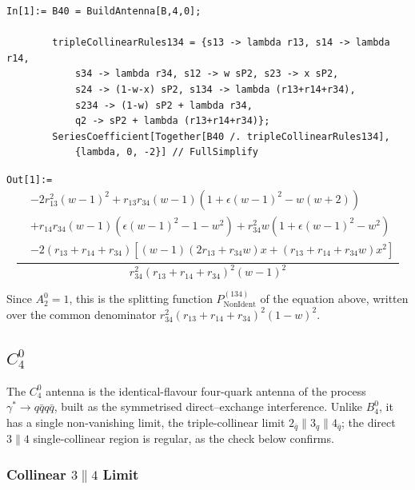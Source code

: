 \begin{mdframed}[backgroundcolor=gray!10, linewidth=0pt]
\begin{lstlisting}
In[1]:= B40 = BuildAntenna[B,4,0];

        tripleCollinearRules134 = {s13 -> lambda r13, s14 -> lambda r14,
            s34 -> lambda r34, s12 -> w sP2, s23 -> x sP2,
            s24 -> (1-w-x) sP2, s134 -> lambda (r13+r14+r34),
            s234 -> (1-w) sP2 + lambda r34,
            q2 -> sP2 + lambda (r13+r14+r34)};
        SeriesCoefficient[Together[B40 /. tripleCollinearRules134],
            {lambda, 0, -2}] // FullSimplify
\end{lstlisting}
\texttt{Out[1]:=}
    \begin{equation*}
        \frac{\begin{aligned}
            &-2r_{13}^2(w-1)^2+r_{13}r_{34}(w-1)\left(1+\epsilon(w-1)^2-w(w+2)\right)\\
            &+r_{14}r_{34}(w-1)\left(\epsilon(w-1)^2-1-w^2\right)+r_{34}^2w\left(1+\epsilon(w-1)^2-w^2\right)\\
            &-2(r_{13}+r_{14}+r_{34})\left[(w-1)(2r_{13}+r_{34}w)x+(r_{13}+r_{14}+r_{34}w)x^2\right]
        \end{aligned}}{r_{34}^2(r_{13}+r_{14}+r_{34})^2(w-1)^2}
    \end{equation*}
\end{mdframed}
Since $A_2^0=1$, this is the splitting function $P_\mathrm{NonIdent}^{(134)}$ of the equation above, written over the common denominator
$r_{34}^2(r_{13}+r_{14}+r_{34})^2(1-w)^2$.


\subsection{$C_4^0$}\label{subsec:localValidationC40}

The $C_4^0$ antenna is the identical-flavour four-quark antenna of the process $\gamma^*\to q\bar qq\bar q$,
built as the symmetrised direct--exchange interference. Unlike $B_4^0$, it has a single non-vanishing
limit, the triple-collinear limit $2_{\bar q}\parallel 3_q\parallel 4_{\bar q}$; the direct $3\parallel 4$ single-collinear region is
regular, as the check below confirms.

\subsubsection{Collinear $3\parallel 4$ Limit}

